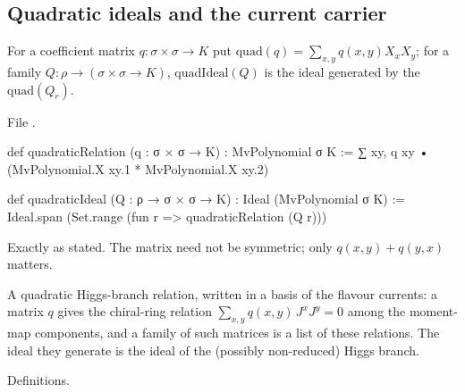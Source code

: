 \subsection{Quadratic ideals and the current carrier}

\begin{definition}\label{l24:def:quad}
For a coefficient matrix $q:\sigma\times\sigma\to K$ put $\mathrm{quad}(q)=\sum_{x,y}q(x,y)X_xX_y$; for a family
$Q:\rho\to(\sigma\times\sigma\to K)$, $\mathrm{quadIdeal}(Q)$ is the ideal generated by the $\mathrm{quad}(Q_r)$.
\end{definition}
\noindent File .
\begin{leancode}
def quadraticRelation (q : σ × σ → K) : MvPolynomial σ K :=
  ∑ xy, q xy • (MvPolynomial.X xy.1 * MvPolynomial.X xy.2)

def quadraticIdeal (Q : ρ → σ × σ → K) : Ideal (MvPolynomial σ K) :=
  Ideal.span (Set.range (fun r => quadraticRelation (Q r)))
\end{leancode}

\begin{dictionary}
Exactly as stated. The matrix need not be symmetric; only $q(x,y)+q(y,x)$ matters.
\end{dictionary}

\begin{physics}
A quadratic Higgs-branch relation, written in a basis of the flavour currents: a matrix $q$ gives the
chiral-ring relation $\sum_{x,y}q(x,y)\,J^xJ^y=0$ among the moment-map components, and a family of such matrices is a
list of these relations. The ideal they generate is the ideal of the (possibly non-reduced) Higgs branch.
\end{physics}

\begin{status}
Definitions.
\end{status}

